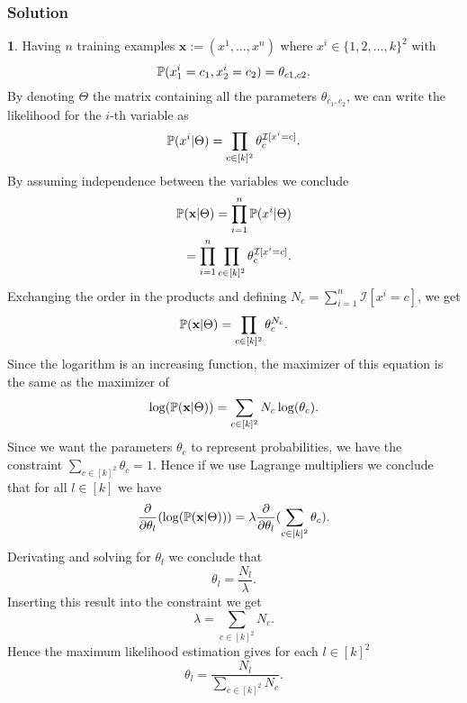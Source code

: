 \documentclass{article}
\begin{document}
\subsubsection*{Solution}
\textbf{1}. Having $n$ training examples $\textbf{x}:=(x^{1},\ldots,x^{n})$ where $x^{i}\in\{1,2,\ldots,k\}^{2}$ with
\begin{equation*}
\mathbb{P}(x_{1}^{i}=c_{1},x_{2}^{i}=c_{2})=\theta_{c1,c2}.
\end{equation*}
By denoting $\Theta$ the matrix containing all the parameters $\theta_{c_{1},c_{2}}$, we can write the likelihood for the $i$-th variable as
\begin{equation*}
\mathbb{P}(x^{i}|\Theta)=\prod_{c\in[k]^{2}}\theta_{c}^{\mathcal{I}[x^{i}=c]}.
\end{equation*}
By assuming independence between the variables we conclude 
\begin{eqnarray*}
\mathbb{P}(\textbf{x}|\Theta)=\prod_{i=1}^{n}\mathbb{P}(x^{i}|\Theta)\\
=\prod_{i=1}^{n}\prod_{c\in[k]^{2}}\theta_{c}^{\mathcal{I}[x^{i}=c]}.
\end{eqnarray*}
Exchanging the order in the products and defining $N_c = \sum_{i=1}^n \mathcal{I}[x^i = c]$, we get
\begin{equation*}
\mathbb{P}(\textbf{x}|\Theta)=\prod_{c\in[k]^{2}}\theta_{c}^{N_{c}}.
\end{equation*}
Since the logarithm is an increasing function, the maximizer of this equation is the same as the maximizer of 
\begin{equation}\label{eqnloglikelihood}
\log(\mathbb{P}(\textbf{x}|\Theta))=\sum_{c\in[k]^{2}}N_{c}\log(\theta_{c}).
\end{equation}
Since we want the parameters $\theta_{c}$ to represent probabilities, we have the constraint $\sum_{c\in [k]^{2}}\theta_{c}=1$. Hence
if we use Lagrange multipliers we conclude that for all $l\in [k]$ we have 
\begin{equation*}
\frac{\partial}{\partial\theta_{l}}(\log(\mathbb{P}(\textbf{x}|\Theta)))=\lambda\frac{\partial}{\partial\theta_{l}}(\sum_{c\in [k]^{2}}\theta_{c}).
\end{equation*}
Derivating and solving for $\theta_{l}$ we conclude that
\begin{equation*}
\theta_{l}=\frac{N_{l}}{\lambda}.
\end{equation*}
Inserting this result into the constraint we get
\begin{equation*}
\lambda=\sum_{c\in [k]^{2}}N_c.
\end{equation*}
Hence the maximum likelihood estimation gives for each $l\in[k]^{2}$ 
\begin{equation*}
\theta_{l}=\frac{N_l}{\sum_{c\in[k]^{2}}N_c}.
\end{equation*}
\newline
\end{document}
